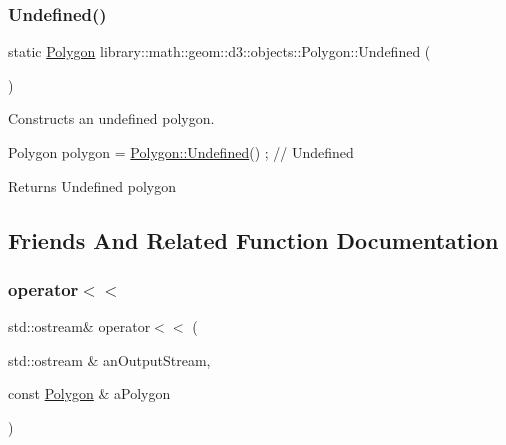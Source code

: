 \subsubsection{\texorpdfstring{Undefined()}{Undefined()}}
{\footnotesize\ttfamily static \hyperlink{classlibrary_1_1math_1_1geom_1_1d3_1_1objects_1_1_polygon}{Polygon} library\+::math\+::geom\+::d3\+::objects\+::\+Polygon\+::\+Undefined (\begin{DoxyParamCaption}{ }\end{DoxyParamCaption})\hspace{0.3cm}{\ttfamily [static]}}



Constructs an undefined polygon. 


\begin{DoxyCode}
Polygon polygon = \hyperlink{classlibrary_1_1math_1_1geom_1_1d3_1_1objects_1_1_polygon_aba08898d8cb7ac1623bb56a2eee8962d}{Polygon::Undefined}() ; \textcolor{comment}{// Undefined}
\end{DoxyCode}


\begin{DoxyReturn}{Returns}
Undefined polygon 
\end{DoxyReturn}


\subsection{Friends And Related Function Documentation}
\mbox{\label{classlibrary_1_1math_1_1geom_1_1d3_1_1objects_1_1_polygon_ae57177a1fae265be31aca4cdcd6add82}} 
\subsubsection{\texorpdfstring{operator$<$$<$}{operator<<}}
{\footnotesize\ttfamily std\+::ostream\& operator$<$$<$ (\begin{DoxyParamCaption}\item[{std\+::ostream \&}]{an\+Output\+Stream,  }\item[{const \hyperlink{classlibrary_1_1math_1_1geom_1_1d3_1_1objects_1_1_polygon}{Polygon} \&}]{a\+Polygon }\end{DoxyParamCaption})\hspace{0.3cm}{\ttfamily [friend]}}



